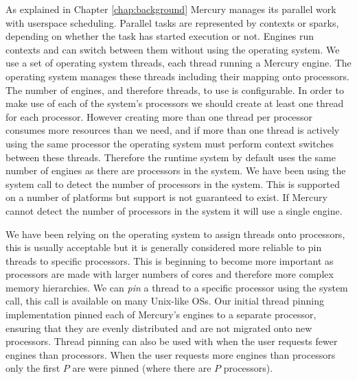 

As explained in Chapter \ref{chap:background} Mercury manages its parallel
work with userspace scheduling.
Parallel tasks are represented by contexts or sparks,
depending on whether the task has started execution or not.
Engines run contexts and can switch between them without using the operating
system.
We use a set of operating system threads,
each thread running a Mercury engine.
The operating system manages these threads including their mapping onto
processors.
The number of engines, and therefore threads, to use is configurable.
In order to make use of each of the system's processors we should create at
least one thread for each processor.
However creating more than one thread per processor consumes more resources
than we need,
and if more than one thread is actively using the same processor the
operating system must perform context switches between these threads.
Therefore the runtime system by default uses the same number of engines as
there are processors in the system.
We have been using the  system call to detect the number of
processors in the system.
This is supported on a number of platforms but support is not guaranteed to
exist.
If Mercury cannot detect the number of processors in the system it will
use a single engine.

We have been relying on the operating system to assign threads onto
processors,
this is usually acceptable but it is generally considered more reliable to
pin threads to specific processors.
This is beginning to become more important as processors are made with
larger numbers of cores and therefore more complex memory hierarchies.
We can \emph{pin} a thread to a specific processor using the
 system call,
this call is available on many Unix-like OSs.
Our initial thread pinning implementation pinned each of Mercury's engines
to a separate processor,
ensuring that they are evenly distributed and are not migrated onto new
processors.
Thread pinning can also be used with when the user requests fewer engines
than processors.
When the user requests more engines than processors only the first $P$ are
were pinned (where there are $P$ processors).

